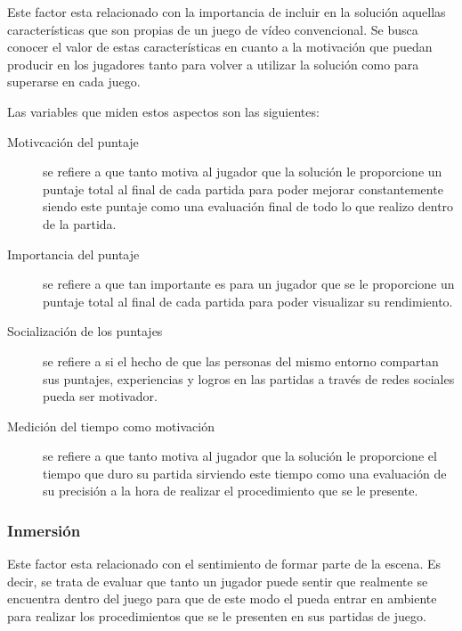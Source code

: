 
Este factor esta relacionado con la importancia de incluir en la solución
aquellas características que son propias de un juego de vídeo convencional. Se
busca conocer el valor de estas características en cuanto a la motivación que
puedan producir en los jugadores tanto para volver a utilizar la solución como
para superarse en cada juego.

Las variables que miden estos aspectos son las siguientes:

\begin{description}
   
\item[Motivcación del puntaje] se refiere a que tanto motiva al jugador que la
    solución le proporcione un puntaje total al final de cada partida para poder
    mejorar constantemente siendo este puntaje como una evaluación final de todo
    lo que realizo dentro de la partida.

\item[Importancia del puntaje] se refiere a que tan importante es para un
    jugador que se le proporcione un puntaje total al final de cada partida para
    poder visualizar su rendimiento.

\item[Socialización de los puntajes] se refiere a si el hecho de que las
    personas del mismo entorno compartan sus puntajes, experiencias y logros en
    las partidas a través de redes sociales pueda ser motivador.

\item[Medición del tiempo como motivación] se refiere a que tanto motiva al
    jugador que la solución le proporcione el tiempo que duro su partida
    sirviendo este tiempo como una evaluación de su precisión a la hora de
    realizar el procedimiento que se le presente.

\end{description} 


\subsubsection{Inmersión}

Este factor esta relacionado con el sentimiento de formar parte de la escena. Es
decir, se trata de evaluar que tanto un jugador puede sentir que realmente se
encuentra dentro del juego para que de este modo el pueda entrar en ambiente
para realizar los procedimientos que se le presenten en sus partidas de juego.

